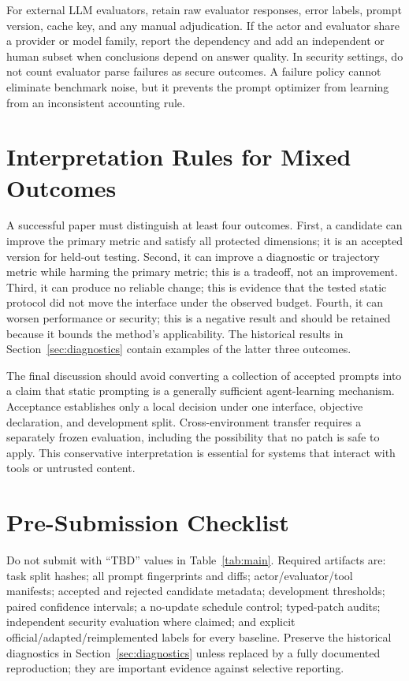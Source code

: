 \documentclass[10pt]{article}
\begin{document}
For external LLM evaluators, retain raw evaluator responses, error labels, prompt version, cache key, and any manual adjudication. If the actor and evaluator share a provider or model family, report the dependency and add an independent or human subset when conclusions depend on answer quality. In security settings, do not count evaluator parse failures as secure outcomes. A failure policy cannot eliminate benchmark noise, but it prevents the prompt optimizer from learning from an inconsistent accounting rule.

\section{Interpretation Rules for Mixed Outcomes}
A successful paper must distinguish at least four outcomes. First, a candidate can improve the primary metric and satisfy all protected dimensions; it is an accepted version for held-out testing. Second, it can improve a diagnostic or trajectory metric while harming the primary metric; this is a tradeoff, not an improvement. Third, it can produce no reliable change; this is evidence that the tested static protocol did not move the interface under the observed budget. Fourth, it can worsen performance or security; this is a negative result and should be retained because it bounds the method's applicability. The historical results in Section~\ref{sec:diagnostics} contain examples of the latter three outcomes.

The final discussion should avoid converting a collection of accepted prompts into a claim that static prompting is a generally sufficient agent-learning mechanism. Acceptance establishes only a local decision under one interface, objective declaration, and development split. Cross-environment transfer requires a separately frozen evaluation, including the possibility that no patch is safe to apply. This conservative interpretation is essential for systems that interact with tools or untrusted content.

\section{Pre-Submission Checklist}
Do not submit with ``TBD'' values in Table~\ref{tab:main}. Required artifacts are: task split hashes; all prompt fingerprints and diffs; actor/evaluator/tool manifests; accepted and rejected candidate metadata; development thresholds; paired confidence intervals; a no-update schedule control; typed-patch audits; independent security evaluation where claimed; and explicit official/adapted/reimplemented labels for every baseline. Preserve the historical diagnostics in Section~\ref{sec:diagnostics} unless replaced by a fully documented reproduction; they are important evidence against selective reporting.
\end{document}

